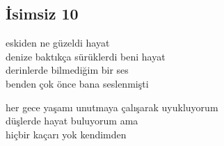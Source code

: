\subsection{İsimsiz 10}

eskiden ne güzeldi hayat \\
	denize baktıkça sürüklerdi beni hayat \\
derinlerde bilmediğim bir ses \\
	benden çok önce bana seslenmişti

\noindent\newline
her gece yaşamı unutmaya çalışarak uyukluyorum \\
	düşlerde hayat buluyorum ama \\
hiçbir kaçarı yok kendimden